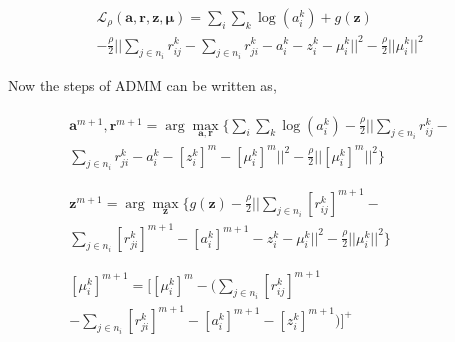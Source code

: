 \documentclass[lettersize,journal]{IEEEtran}
\begin{document}
\begin{multline} \label{aug_lag_admm2}
    \mathcal{L}_{\rho} (\bm{a}, \bm{r}, \bm{z}, \bm{\mu}) = \sum_i \sum_k \log ( a_i^k ) + g(\bm{z})\\
    - \frac{\rho}{2} \Bigg|\Bigg| \sum_{j \in n_i} r_{ij}^k - \sum_{j \in n_i} r_{ji}^k - a_i^k - z_i^k - \mu_i^k \Bigg|\Bigg|^2 - \frac{\rho}{2} \Big|\Big| \mu_i^k \Big|\Big|^2
\end{multline}

Now the steps of ADMM can be written as,

\begin{subequations} \label{eq:admm_scaled}    
    \begin{align} \label{admm_scaled_a} 
    \begin{split}
        \bm{a}^{m+1}, \bm{r}^{m+1} = \arg \max_{\bm{a}, \bm{r}} \Bigg\{ \sum_i \sum_k \log ( a_i^k ) - \frac{\rho}{2} \Bigg|\Bigg| \sum_{j \in n_i} r_{ij}^k - \\
        \sum_{j \in n_i} r_{ji}^k - a_i^k - [z_i^k]^m - [\mu_i^k]^m \Bigg|\Bigg|^2 - \frac{\rho}{2} \Big|\Big| [\mu_i^k]^m \Big|\Big|^2 \Bigg\} \\
    \end{split}\\    
    \begin{split} \label{admm_scaled_b} 
        \bm{z}^{m+1} = \arg \max_{\bm{z}} \Bigg\{g(\bm{z}) - \frac{\rho}{2} \Bigg|\Bigg| \sum_{j \in n_i} [r_{ij}^k]^{m+1} - \\
        \sum_{j \in n_i} [r_{ji}^k]^{m+1} - [a_i^k]^{m+1} - z_i^k - \mu_i^k \Bigg|\Bigg|^2 - \frac{\rho}{2} \Big|\Big| \mu_i^k \Big|\Big|^2\Bigg\} \\
    \end{split}\\
    \begin{split} \label{admm_scaled_c} 
        [\mu_i^k]^{m+1} = \Bigg[ [\mu_i^k]^m - \Bigg( \sum_{j \in n_i} [r_{ij}^k]^{m+1} \\
        - \sum_{j \in n_i} [r_{ji}^k]^{m+1} - [a_i^k]^{m+1} - [z_i^k]^{m+1} \Bigg) \Bigg]^+
        \end{split}
    \end{align}
\end{subequations} 
\end{document}
